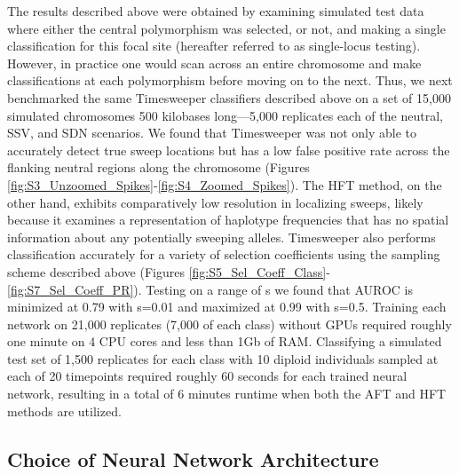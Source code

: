 The results described above were obtained by examining simulated test data where either the central polymorphism was selected, or not, and making a single classification for this focal site (hereafter referred to as single-locus testing). However, in practice one would scan across an entire chromosome and make classifications at each polymorphism before moving on to the next. Thus, we next benchmarked the same Timesweeper classifiers described above on a set of 15,000 simulated chromosomes 500 kilobases long—5,000 replicates each of the neutral, SSV, and SDN scenarios. We found that Timesweeper was not only able to accurately detect true sweep locations but has a low false positive rate across the flanking neutral regions along the chromosome (Figures \ref{fig:S3_Unzoomed_Spikes}-\ref{fig:S4_Zoomed_Spikes}). The HFT method, on the other hand, exhibits comparatively low resolution in localizing sweeps, likely because it examines a representation of haplotype frequencies that has no spatial information about any potentially sweeping alleles. Timesweeper also performs classification accurately for a variety of selection coefficients using the sampling scheme described above (Figures \ref{fig:S5_Sel_Coeff_Class}-\ref{fig:S7_Sel_Coeff_PR}). Testing on a range of s we found that AUROC is minimized at 0.79 with s=0.01 and maximized at 0.99 with s=0.5. 
Training each network on 21,000 replicates (7,000 of each class) without GPUs required roughly one minute on 4 CPU cores and less than 1Gb of RAM. Classifying a simulated test set of 1,500 replicates for each class with 10 diploid individuals sampled at each of 20 timepoints required roughly 60 seconds for each trained neural network, resulting in a total of 6 minutes runtime when both the AFT and HFT methods are utilized. \\

\subsection{Choice of Neural Network Architecture}

